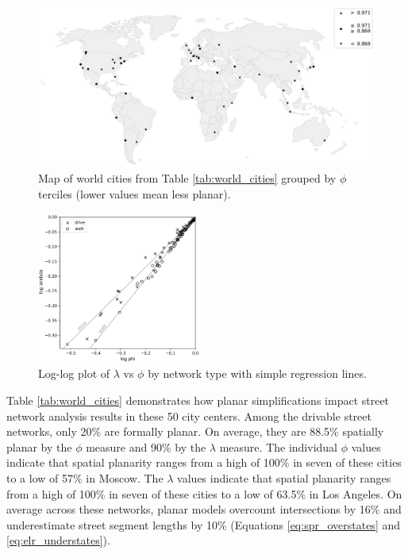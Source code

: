 \documentclass[Afour,sageh,times]{sagej}
\begin{document}
\begin{figure}[htbp]
	\center
	\includegraphics[width=\textwidth]{world_map_bw.png}
	\caption{Map of world cities from Table \ref{tab:world_cities} grouped by $\phi$ terciles (lower values mean less planar).}
	\label{fig:world_map_bw}
\end{figure}

\begin{figure}[htbp]
	\includegraphics[width=0.48\textwidth]{regression_phi_split.png}
	\caption{Log-log plot of $\lambda$ vs $\phi$ by network type with simple regression lines.}
	\label{fig:regression_split}
\end{figure}

Table \ref{tab:world_cities} demonstrates how planar simplifications impact street network analysis results in these 50 city centers. Among the drivable street networks, only 20\% are formally planar. On average, they are 88.5\% spatially planar by the $\phi$ measure and 90\% by the $\lambda$ measure. The individual $\phi$ values indicate that spatial planarity ranges from a high of 100\% in seven of these cities to a low of 57\% in Moscow. The $\lambda$ values indicate that spatial planarity ranges from a high of 100\% in seven of these cities to a low of 63.5\% in Los Angeles. On average across these networks, planar models overcount intersections by 16\% and underestimate street segment lengths by 10\% (Equations \ref{eq:spr_overstates} and \ref{eq:elr_understates}).
\end{document}
